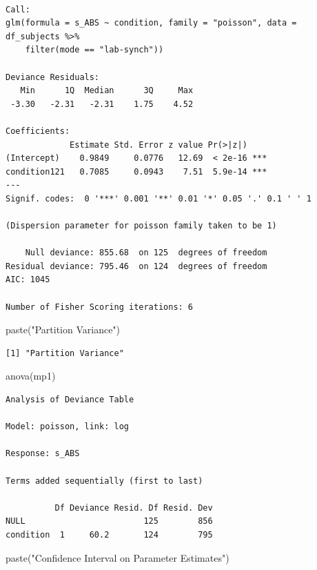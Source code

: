 \documentclass[
  letterpaper,
  DIV=11,
  numbers=noendperiod]{scrreprt}
\newenvironment{Shaded}{\begin{snugshade}}{\end{snugshade}}
\newcommand{\FunctionTok}[1]{\textcolor[rgb]{0.28,0.35,0.67}{#1}}
\newcommand{\NormalTok}[1]{\textcolor[rgb]{0.00,0.23,0.31}{#1}}
\newcommand{\StringTok}[1]{\textcolor[rgb]{0.13,0.47,0.30}{#1}}
\begin{document}
\begin{verbatim}

Call:
glm(formula = s_ABS ~ condition, family = "poisson", data = df_subjects %>% 
    filter(mode == "lab-synch"))

Deviance Residuals: 
   Min      1Q  Median      3Q     Max  
 -3.30   -2.31   -2.31    1.75    4.52  

Coefficients:
             Estimate Std. Error z value Pr(>|z|)    
(Intercept)    0.9849     0.0776   12.69  < 2e-16 ***
condition121   0.7085     0.0943    7.51  5.9e-14 ***
---
Signif. codes:  0 '***' 0.001 '**' 0.01 '*' 0.05 '.' 0.1 ' ' 1

(Dispersion parameter for poisson family taken to be 1)

    Null deviance: 855.68  on 125  degrees of freedom
Residual deviance: 795.46  on 124  degrees of freedom
AIC: 1045

Number of Fisher Scoring iterations: 6
\end{verbatim}

\begin{Shaded}
\begin{Highlighting}[]
\FunctionTok{paste}\NormalTok{(}\StringTok{"Partition Variance"}\NormalTok{)}
\end{Highlighting}
\end{Shaded}

\begin{verbatim}
[1] "Partition Variance"
\end{verbatim}

\begin{Shaded}
\begin{Highlighting}[]
\FunctionTok{anova}\NormalTok{(mp1)}
\end{Highlighting}
\end{Shaded}

\begin{verbatim}
Analysis of Deviance Table

Model: poisson, link: log

Response: s_ABS

Terms added sequentially (first to last)

          Df Deviance Resid. Df Resid. Dev
NULL                        125        856
condition  1     60.2       124        795
\end{verbatim}

\begin{Shaded}
\begin{Highlighting}[]
\FunctionTok{paste}\NormalTok{(}\StringTok{"Confidence Interval on Parameter Estimates"}\NormalTok{)}
\end{Highlighting}
\end{Shaded}
\end{document}

